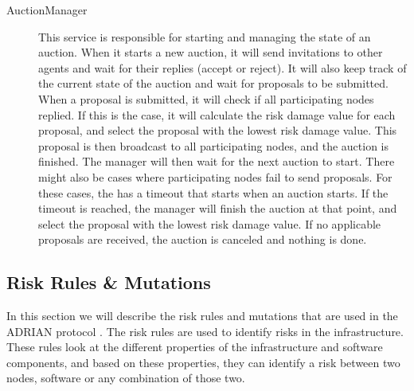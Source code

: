 \begin{description}
    \item[AuctionManager] This service is responsible for starting and managing the state of an auction. When it starts a new auction, it will send invitations to other agents and wait for their replies (accept or reject). It will also keep track of the current state of the auction and wait for proposals to be submitted. When a proposal is submitted, it will check if all participating nodes replied. If this is the case, it will calculate the risk damage value for each proposal, and select the proposal with the lowest risk damage value. This proposal is then broadcast to all participating nodes, and the auction is finished. The manager will then wait for the next auction to start. There might also be cases where participating nodes fail to send proposals. For these cases, the  has a timeout that starts when an auction starts. If the timeout is reached, the manager will finish the auction at that point, and select the proposal with the lowest risk damage value. If no applicable proposals are received, the auction is canceled and nothing is done.
\end{description}




\subsection{Risk Rules \& Mutations}
In this section we will describe the risk rules and mutations that are used in the ADRIAN protocol \cite{mann2023ADRIAN}. The risk rules are used to identify risks in the infrastructure. These rules look at the different properties of the infrastructure and software components, and based on these properties, they can identify a risk between two nodes, software or any combination of those two. 

